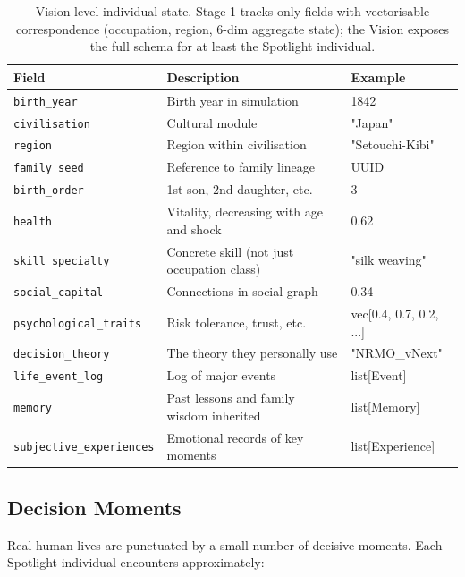 \begin{table}[ht]
\centering
\small
\begin{tabularx}{\linewidth}{lXl}
\toprule
\textbf{Field} & \textbf{Description} & \textbf{Example} \\
\midrule
\texttt{birth\_year} & Birth year in simulation & 1842 \\
\texttt{civilisation} & Cultural module & "Japan" \\
\texttt{region} & Region within civilisation & "Setouchi-Kibi" \\
\texttt{family\_seed} & Reference to family lineage & UUID \\
\texttt{birth\_order} & 1st son, 2nd daughter, etc. & 3 \\
\texttt{health} & Vitality, decreasing with age and shock & 0.62 \\
\texttt{skill\_specialty} & Concrete skill (not just occupation class) &
"silk weaving" \\
\texttt{social\_capital} & Connections in social graph & 0.34 \\
\texttt{psychological\_traits} & Risk tolerance, trust, etc. & vec[0.4,
0.7, 0.2, ...] \\
\texttt{decision\_theory} & The theory they personally use & "NRMO\_vNext" \\
\texttt{life\_event\_log} & Log of major events & list[Event] \\
\texttt{memory} & Past lessons and family wisdom inherited & list[Memory] \\
\texttt{subjective\_experiences} & Emotional records of key moments & list[Experience] \\
\bottomrule
\end{tabularx}
\caption[Individual state schema]{Vision-level individual state.
Stage 1 tracks only fields with vectorisable correspondence
(occupation, region, 6-dim aggregate state); the Vision exposes the
full schema for at least the Spotlight individual.}
\label{tab:vision-individual-state}
\end{table}

\subsection{Decision Moments}
\label{sec:vision-decision-moments}

Real human lives are punctuated by a small number of decisive moments.
Each Spotlight individual encounters approximately:

